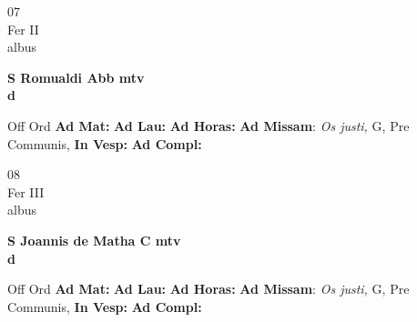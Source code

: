 \documentclass[10pt, openany]{book}
\begin{document}
        \begin{center}
            \begin{minipage}{3.5in}
                \vspace{2em}
                \begin{minipage}{0.5in}
                    {\Huge 07} \\
                    {\normalsize Fer II} \\
                    {\normalsize albus}
                \end{minipage}
                \begin{minipage}{3.0in}
                    \textbf{ \large S Romualdi Abb mtv \\
                    \textnormal{\normalsize d}} \\ 
                \end{minipage}
                \begin{justify}Off Ord
                    \textbf{Ad Mat: }
                    \textbf{Ad Lau: }
                    \textbf{Ad Horas: }\textbf{Ad Missam}: \textit{Os justi,} G, Pre Communis,  
                    \textbf{In Vesp: }
                    \textbf{Ad Compl: }
                \end{justify}
            \end{minipage}
        \end{center}
    
        \begin{center}
            \begin{minipage}{3.5in}
                \vspace{2em}
                \begin{minipage}{0.5in}
                    {\Huge 08} \\
                    {\normalsize Fer III} \\
                    {\normalsize albus}
                \end{minipage}
                \begin{minipage}{3.0in}
                    \textbf{ \large S Joannis de Matha C mtv \\
                    \textnormal{\normalsize d}} \\ 
                \end{minipage}
                \begin{justify}Off Ord
                    \textbf{Ad Mat: }
                    \textbf{Ad Lau: }
                    \textbf{Ad Horas: }\textbf{Ad Missam}: \textit{Os justi,} G, Pre Communis,  
                    \textbf{In Vesp: }
                    \textbf{Ad Compl: }
                \end{justify}
            \end{minipage}
        \end{center}
    
\end{document}
